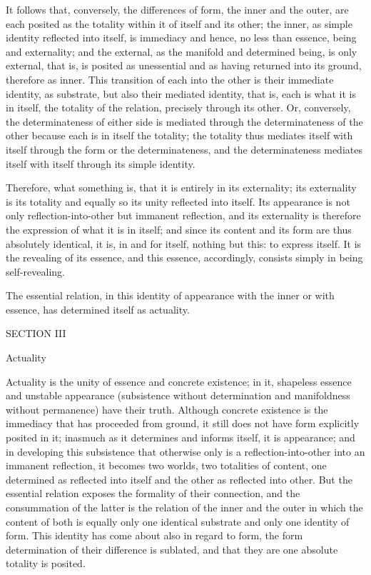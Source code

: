 It follows that, conversely,
the differences of form,
the inner and the outer,
are each posited as the totality
within it of itself and its other;
the inner, as simple identity
reflected into itself, is immediacy
and hence, no less than essence,
being and externality;
and the external,
as the manifold and determined being,
is only external,
that is, is posited as unessential
and as having returned into its ground,
therefore as inner.
This transition of each into the other is
their immediate identity, as substrate,
but also their mediated identity, that is,
each is what it is in itself,
the totality of the relation,
precisely through its other.
Or, conversely, the determinateness of
either side is mediated through
the determinateness of the other
because each is in itself the totality;
the totality thus mediates itself with itself
through the form or the determinateness,
and the determinateness mediates
itself with itself through its simple identity.

Therefore, what something is, that it is
entirely in its externality;
its externality is its totality
and equally so its unity reflected into itself.
Its appearance is not only reflection-into-other
but immanent reflection,
and its externality is therefore
the expression of what it is in itself;
and since its content and its form
are thus absolutely identical,
it is, in and for itself, nothing but this:
to express itself.
It is the revealing of its essence,
and this essence, accordingly,
consists simply in being self-revealing.

The essential relation, in this identity
of appearance with the inner or with essence,
has determined itself as actuality.

SECTION III

Actuality

Actuality is the unity of essence and concrete existence;
in it, shapeless essence and unstable appearance
(subsistence without determination
and manifoldness without permanence)
have their truth.
Although concrete existence is the immediacy
that has proceeded from ground,
it still does not have form explicitly posited in it;
inasmuch as it determines and informs itself, it is appearance;
and in developing this subsistence that otherwise only is
a reflection-into-other into an immanent reflection,
it becomes two worlds, two totalities of content,
one determined as reflected into itself
and the other as reflected into other.
But the essential relation exposes
the formality of their connection,
and the consummation of the latter is
the relation of the inner and the outer
in which the content of both is equally
only one identical substrate
and only one identity of form.
This identity has come about also in regard to form,
the form determination of their difference is sublated,
and that they are one absolute totality is posited.

